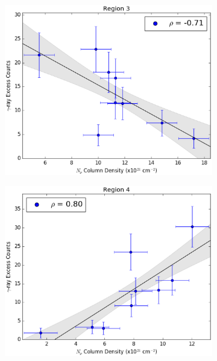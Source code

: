 \documentclass[12pt,a4paper]{article}
\begin{document}
\begin{figure}[H]
	\begin{subfigure}{0.5\textwidth}
		\centering
		\includegraphics[width=0.95\linewidth, height=0.25\textheight]{gamma_mHI_reg3}
	\end{subfigure}
	\begin{subfigure}{0.5\textwidth}
		\centering
		\includegraphics[width=0.9\linewidth, height=0.25\textheight]{gamma_mHI_reg4}
	\end{subfigure}
	\begin{subfigure}{0.5\textwidth}
		\centering

\end{subfigure}
\end{figure}
\end{document}
